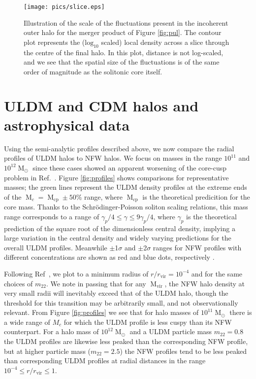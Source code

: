\documentclass[a4paper,11pt]{article}
\begin{document}
\begin{figure}
\centering
\texttt{[image: pics/slice.eps]}
\caption{Illustration of the scale of the fluctuations present in the incoherent outer halo for the merger product of Figure \ref{fig:pul}. The contour plot represents the ($\mathrm{log}_{10}$ scaled) local density across a slice through the centre of the final halo. In this plot, distance is not log-scaled, and we see that the spatial size of the fluctuations is of the same order of magnitude as the solitonic core itself.}\label{fig:contour}
\end{figure}


\section{ULDM and CDM halos and astrophysical data}\label{sec:velocity}

 
Using the semi-analytic profiles described above, we now compare the radial profiles of ULDM halos to NFW halos. We focus on masses in the range $10^{11}$ and $10^{12} \operatorname{M}_{\odot}$ since these cases showed an apparent worsening of the core-cusp problem in Ref.~\cite{Robles:2018fur}. Figure \ref{fig:profiles} shows comparisons for representative masses; the green lines represent the ULDM density profiles at the extreme ends of the $\operatorname{M}_c = \operatorname{M}_{\mathrm{cp}} \pm 50 \% $ range, where $\operatorname{M}_{\mathrm{cp}}$ is the theoretical predicition for the core mass. Thanks to the  Schr{\"o}dinger-Poisson soliton scaling relations, this mass range corresponds to a range of $ \gamma_p /4 \leq \gamma \leq 9\gamma_p/4$, where $\gamma_p$ is the theoretical prediction of the square root of the dimensionless central density, implying a large variation in the central density and widely varying predictions for the overall ULDM profiles. Meanwhile $\pm$1$\sigma$ and $\pm$2$\sigma$ ranges for NFW profiles with different concentrations are shown as red and blue dots, respectively \cite{Maccio:2008pcd}. 

Following Ref~\cite{Robles:2018fur}, we plot to a minimum radius of $r/r_{\mathrm{vir}} = 10^{-4}$ and for the same choices of $m_{22}$. We note in passing that for any $\operatorname{M}_{\mathrm{vir}}$, the NFW halo density at very small radii will inevitably exceed that of the ULDM halo, though the threshold for this transition may be arbitrarily small, and not observationally relevant. From Figure \ref{fig:profiles} we see that for halo masses of $10^{11}\operatorname{M}_{\odot}$ there is a wide range of $M_c$ for which the ULDM profile is less cuspy than its NFW counterpart. For a halo mass of $10^{12}\operatorname{M}_{\odot}$ and a ULDM particle mass $m_{22}=0.8$ the ULDM profiles are likewise less peaked than the corresponding NFW profile, but at higher particle mass ($m_{22}=2.5$) the  NFW profiles tend to be less peaked than corresponding ULDM profiles at radial distances in  the range $10^{-4}\leq r/r_{\mathrm{vir}} \leq 1$.
\end{document}
